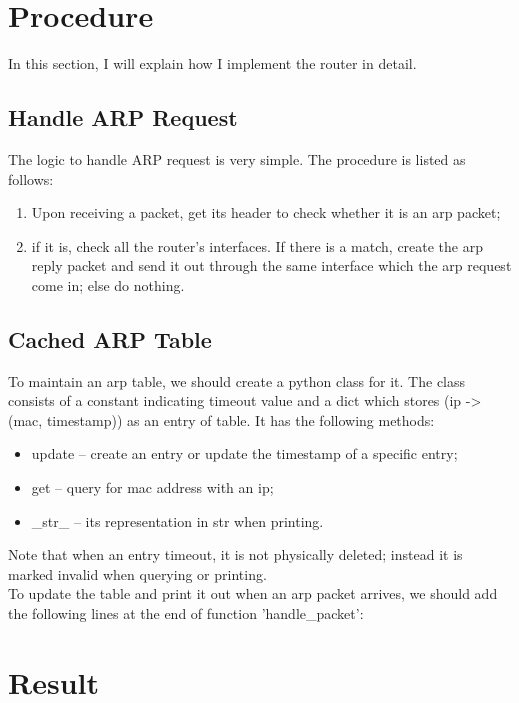 \documentclass[12pt,a4paper,UTF8]{article}
\begin{document}
\section{Procedure}
In this section, I will explain how I implement the router in detail. \\

\subsection{Handle ARP Request}
The logic to handle ARP request is very simple. The procedure is listed as follows:
\begin{enumerate}
	\item Upon receiving a packet, get its header to check whether it is an arp packet;
	\item if it is, check all the router's interfaces. If there is a match, create the arp reply packet and send it out through the same interface which the arp request come in; else do nothing.
\end{enumerate}


\subsection{Cached ARP Table}
To maintain an arp table, we should create a python class for it. The class consists of a constant indicating timeout value and a dict which stores (ip -> (mac, timestamp)) as an entry of table. It has the following methods:
\begin{itemize}
	\item update -- create an entry or update the timestamp of a specific entry;
	\item get -- query for mac address with an ip;
	\item \_str\_ -- its representation in str when printing.
\end{itemize}

Note that when an entry timeout, it is not physically deleted; instead it is marked invalid when querying or printing. \\
To update the table and print it out when an arp packet arrives, we should add the following lines at the end of function 'handle\_packet':


\section{Result}
\end{document}
